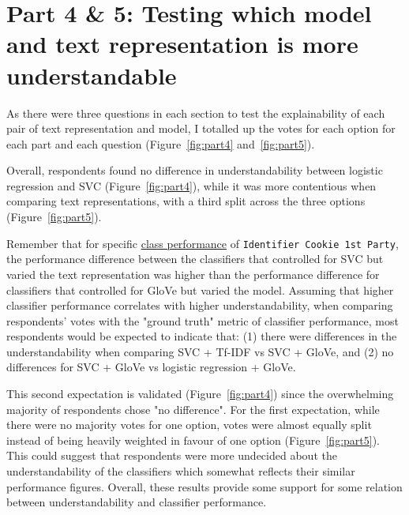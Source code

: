 \section{Part 4 \& 5: Testing which model and text representation is more understandable}
As there were three questions in each section to test the explainability of each pair of text representation and model, I totalled up the votes for each option for each part and each question (Figure~\ref{fig:part4} and~\ref{fig:part5}).

Overall, respondents found no difference in understandability between logistic regression and SVC (Figure~\ref{fig:part4}), while it was more contentious when comparing text representations, with a third split across the three options (Figure~\ref{fig:part5}). 

Remember that for specific \hyperref[fig:heatmaps_perf]{class performance} of \texttt{Identifier Cookie 1st Party}, the performance difference between the classifiers that controlled for SVC but varied the text representation was higher than the performance difference for classifiers that controlled for GloVe but varied the model. Assuming that higher classifier performance correlates with higher understandability, when comparing respondents' votes with the "ground truth" metric of classifier performance, most respondents would be expected to indicate that: (1) there were differences in the understandability when comparing SVC + Tf-IDF vs SVC + GloVe, and (2) no differences for SVC + GloVe vs logistic regression + GloVe. 

This second expectation is validated (Figure~\ref{fig:part4}) since the overwhelming majority of respondents chose "no difference". For the first expectation, while there were no majority votes for one option, votes were almost equally split instead of being heavily weighted in favour of one option (Figure~\ref{fig:part5}). This could suggest that respondents were more undecided about the understandability of the classifiers which somewhat reflects their similar performance figures. Overall, these results provide some support for some relation between understandability and classifier performance.

